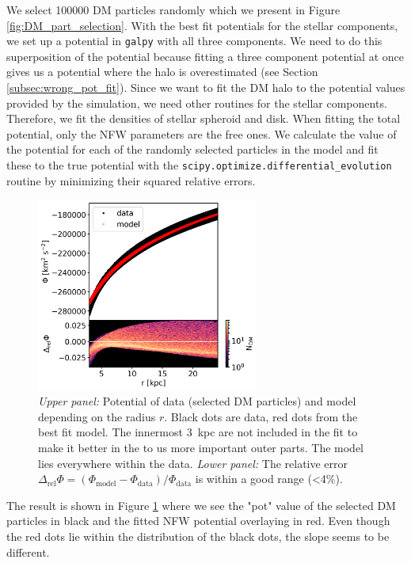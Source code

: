 We select 100000 \ac{DM} particles randomly which we present in Figure \ref{fig:DM_part_selection}. With the best fit potentials for the stellar components, we set up a potential in \texttt{galpy} with all three components. We need to do this superposition of the potential because fitting a three component potential at once gives us a potential where the halo is overestimated (see Section \ref{subsec:wrong_pot_fit}). Since we want to fit the \ac{DM} halo to the potential values provided by the simulation, we need other routines for the stellar components. Therefore, we fit the densities of stellar spheroid and disk. When fitting the total potential, only the \ac{NFW} parameters are the free ones. We calculate the value of the potential for each of the randomly selected particles in the model and fit these to the true potential with the \texttt{scipy.optimize.differential\_evolution} routine by minimizing their squared relative errors.
\begin{figure}
\captionsetup{format=plain}
    \centering
    \includegraphics[width=0.65\textwidth]{plots/Auriga/phi_model_and_data_snap_with_rel_error_127.png}
    \caption{\textit{Upper panel:} Potential of data (selected \ac{DM} particles) and model depending on the radius $r$. Black dots are data, red dots from the best fit model. The innermost \SI{3}{kpc} are not included in the fit to make it better in the to us more important outer parts. The model lies everywhere within the data. \textit{Lower panel:} The relative error $\Delta_\mathrm{rel}\Phi = (\Phi_\mathrm{model} - \Phi_\mathrm{data})/\Phi_\mathrm{data}$ is within a good range (<4\%).}
    \label{fig:potential_best_fit}
\end{figure}
The result is shown in Figure \ref{fig:potential_best_fit} where we see the "pot" value of the selected \ac{DM} particles in black and the fitted \ac{NFW} potential overlaying in red. Even though the red dots lie within the distribution of the black dots, the slope seems to be different. 
